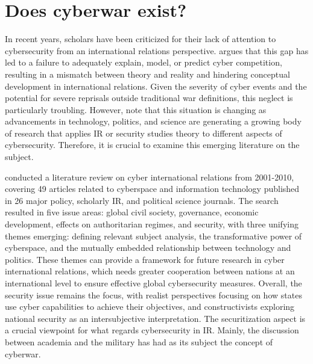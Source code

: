 \section{Does cyberwar exist?} 
In recent years, scholars have been criticized for their lack of attention to cybersecurity from an international relations perspective. \textcite{kello_2013_the}  argues that this gap has led to a failure to adequately explain, model, or predict cyber competition, resulting in a mismatch between theory and reality and hindering conceptual development in international relations. Given the severity of cyber events and the potential for severe reprisals outside traditional war definitions, this neglect is particularly troubling. However, \textcite{cavelty_2020_cyber} note that this situation is changing as advancements in technology, politics, and science are generating a growing body of research that applies IR or security studies theory to different aspects of cybersecurity. Therefore, it is crucial to examine this emerging literature on the subject. 


\textcite{reardon_2012_the} conducted a literature review on cyber international relations from 2001-2010, covering 49 articles related to cyberspace and information technology published in 26 major policy, scholarly IR, and political science journals. The search resulted in five issue areas: global civil society, governance, economic development, effects on authoritarian regimes, and security, with three unifying themes emerging: defining relevant subject analysis, the transformative power of cyberspace, and the mutually embedded relationship between technology and politics. These themes can provide a framework for future research in cyber international relations, which needs greater cooperation between nations at an international level to ensure effective global cybersecurity measures. Overall, the security issue remains the focus, with realist perspectives focusing on how states use cyber capabilities to achieve their objectives, and constructivists exploring national security as an intersubjective interpretation.
The securitization aspect is a crucial viewpoint for what regards cybersecurity in IR. Mainly, the discussion between academia and the military has had as its subject the concept of cyberwar. 

